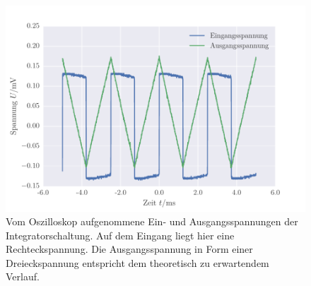 \FloatBarrier
\begin{figure}[!h]
\centering
\includegraphics[scale=0.75]{../Grafiken/Integrator_Oszilloskop_Rechteck.pdf}
\caption{Vom Oszilloskop aufgenommene Ein- und Ausgangsspannungen der Integratorschaltung. Auf dem Eingang
	liegt hier eine Rechteckspannung.  Die Ausgangsspannung in Form einer Dreieckspannung entspricht dem theoretisch
	zu erwartendem Verlauf.\label{fig:integrator_oszilloskop_rechteck}}
\end{figure}
\FloatBarrier